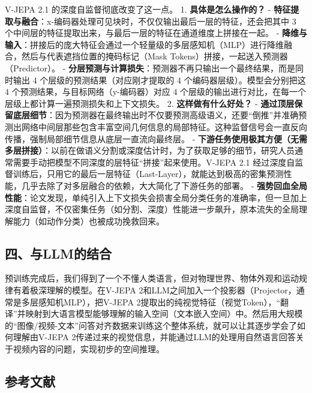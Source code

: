 V-JEPA 2.1 的深度自监督彻底改变了这一点。
1. \textbf{具体是怎么操作的？}
- \textbf{特征提取与融合}：x-编码器处理可见块时，不仅仅输出最后一层的特征，还会把其中 \(3\) 个中间层的特征提取出来，与最后一层的特征在通道维度上拼接在一起。
- \textbf{降维与输入}：拼接后的庞大特征会通过一个轻量级的多层感知机（MLP）进行降维融合，然后与代表遮挡位置的掩码标记（Mask Tokens）拼接，一起送入预测器（Predictor）。
- \textbf{分层预测与计算损失}：预测器不再只输出一个最终结果，而是同时输出 \(4\) 个层级的预测结果（对应刚才提取的 \(4\) 个编码器层级）。模型会分别把这 \(4\) 个预测结果，与目标网络（y-编码器）对应 \(4\) 个层级的输出进行对比，在每一个层级上都计算一遍预测损失和上下文损失。
2. \textbf{这样做有什么好处？}
- \textbf{通过顶层保留底层细节}：因为预测器在最终输出时不仅要预测高级语义，还要``倒推''并准确预测出网络中间层那些包含丰富空间几何信息的局部特征。这种监督信号会一直反向传播，强制局部细节信息从底层一直流向最终层。
- \textbf{下游任务使用极其方便（无需多层拼接）}：以前在做语义分割或深度估计时，为了获取足够的细节，研究人员通常需要手动把模型不同深度的层特征``拼接''起来使用。V-JEPA 2.1 经过深度自监督训练后，只用它的最后一层特征（Last-Layer），就能达到极高的密集预测性能，几乎去除了对多层融合的依赖，大大简化了下游任务的部署。
- \textbf{强势回血全局性能}：论文发现，单纯引入上下文损失会损害全局分类任务的准确率，但一旦加上深度自监督，不仅密集任务（如分割、深度）性能进一步飙升，原本流失的全局理解能力（如动作分类）也被成功挽救回来。

\hypertarget{ux56dbux4e0ellmux7684ux7ed3ux5408}{%
\subsection{四、与LLM的结合}\label{ux56dbux4e0ellmux7684ux7ed3ux5408}}

预训练完成后，我们得到了一个不懂人类语言，但对物理世界、物体外观和运动规律有着极深理解的模型。在V-JEPA 2和LLM之间加入一个投影器（Projector，通常是多层感知机MLP），把V-JEPA 2提取出的纯视觉特征（视觉Token），``翻译''并映射到大语言模型能够理解的输入空间（文本嵌入空间）中。然后用大规模的``图像/视频-文本''问答对齐数据来训练这个整体系统，就可以让其逐步学会了如何理解由V-JEPA 2传递过来的视觉信息，并能通过LLM的处理用自然语言回答关于视频内容的问题，实现初步的空间推理。

\hypertarget{ux53c2ux8003ux6587ux732e-189}{%
\subsection{参考文献}\label{ux53c2ux8003ux6587ux732e-189}}

